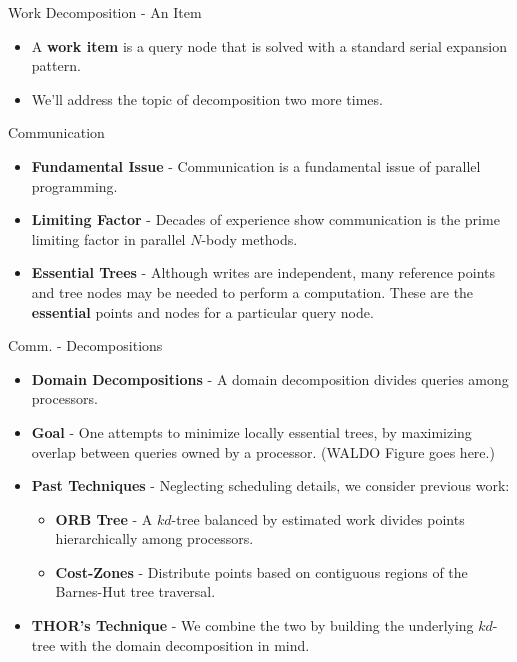 \documentclass[pdf,colorBG,slideColor]{prosper}
\newcommand{\itemt}[1]{\item {\bf #1} -}
\newcommand{\defterm}[1]{{\bf #1}}
\begin{document}
\begin{slide}{Work Decomposition - An Item}
  \begin{itemize}
    \item A \defterm{work item} is a query node that is solved with a standard
    serial expansion pattern.
    \item We'll address the topic of decomposition two more times.
  \end{itemize}
\end{slide}

\begin{slide}{Communication}
  \begin{itemize}
    \itemt{Fundamental Issue} Communication is a fundamental issue of parallel programming.
    \itemt{Limiting Factor} Decades of experience show communication is the prime
    limiting factor in parallel $N$-body methods.
    \itemt{Essential Trees} Although writes are independent, many reference
    points and tree nodes may be needed to perform a computation.  These are
    the \defterm{essential} points and nodes for a particular query node.
  \end{itemize}
\end{slide}

\begin{slide}{Comm. - Decompositions}
  \begin{itemize}
    \itemt{Domain Decompositions}
    A domain decomposition divides queries among processors.
    \itemt{Goal}
    One attempts to minimize locally essential trees, by maximizing
    overlap between queries owned by a processor. (WALDO Figure goes here.)
    \itemt{Past Techniques}
    Neglecting scheduling details, we consider previous work:
    \begin{itemize}
      \itemt{ORB Tree} A $kd$-tree balanced by estimated work divides
      points hierarchically among processors.
      \itemt{Cost-Zones} Distribute points based on contiguous regions of
      the Barnes-Hut tree traversal.
    \end{itemize}
    \itemt{THOR's Technique}
    We combine the two by building the underlying $kd$-tree with
    the domain decomposition in mind.
  \end{itemize}
\end{slide}
\end{document}
